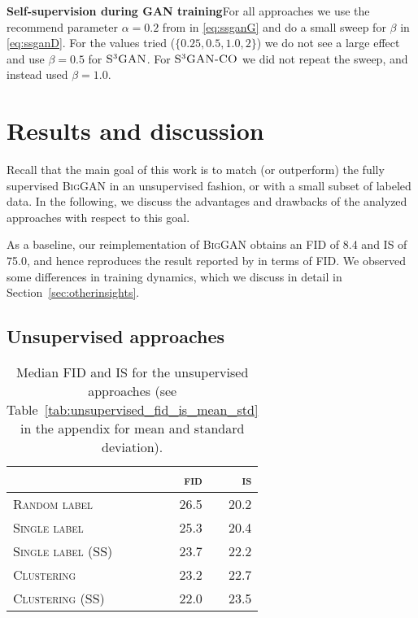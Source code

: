 \documentclass{article}
\newcommand{\cotrainSSS}{\textsc{S\textsuperscript{3}GAN-CO}}
\newcommand{\tranSSS}{\textsc{S\textsuperscript{3}GAN}}
\newcommand{\tranC}{\textsc{Clustering}}
\newcommand{\slabels}{\textsc{Single label}}
\newcommand{\rlabels}{\textsc{Random label}}
\newcommand{\biggan}{\textsc{BigGAN}}
\begin{document}
\textbf{Self-supervision during GAN training}\quad For all approaches we use the recommend parameter $\alpha=0.2$ from \cite{chen2019self} in \eqref{eq:ssganG} and do a small sweep for $\beta$ in \eqref{eq:ssganD}. For the values tried ($\{0.25, 0.5, 1.0, 2\}$) we do not see a large effect and use $\beta=0.5$ for $\tranSSS$. For $\cotrainSSS$ we did not repeat the sweep, and instead used $\beta=1.0$.

\section{Results and discussion}

Recall that the main goal of this work is to match (or outperform) the fully supervised \biggan{} in an unsupervised fashion, or with a small subset of labeled data. 
In the following, we discuss the advantages and drawbacks of the analyzed approaches with respect to this goal.

As a baseline, our reimplementation of \biggan{} obtains an FID of 8.4 and IS of 75.0, and hence reproduces the result reported by \citet{brock2018large} in terms of FID. We observed some differences in training dynamics, which we discuss in detail in Section~\ref{sec:otherinsights}. 

\subsection{Unsupervised approaches}
\begin{table}[b]
\centering
\caption{Median FID and IS for the unsupervised approaches (see Table~\ref{tab:unsupervised_fid_is_mean_std} in the appendix for mean and standard deviation).\vspace{0.2cm}}
\setlength\tabcolsep{4.5pt}
\begin{tabular}{lrr}
\toprule
{} & \textsc{fid} & \textsc{is} \\\midrule
\rlabels{}        &           26.5 &                 20.2 \\\midrule
\slabels{}        &           25.3 &                 20.4 \\
\slabels{} (SS)   &           23.7 &                 22.2 \\\midrule
\tranC{}          &           23.2 &                 22.7 \\
\tranC{} (SS)     &           22.0 &                 23.5 \\
\bottomrule
\end{tabular} \label{tab:unsupervised}
\end{table}
\end{document}
